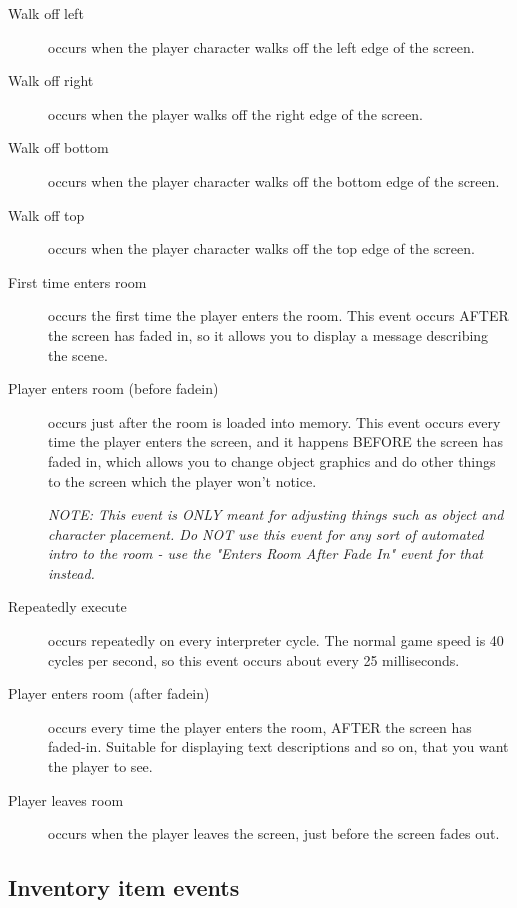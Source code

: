 \begin{description}
\item [Walk off left] occurs when the player character walks off the left edge
of the screen.
\item [Walk off right] occurs when the player walks off the right edge of the
screen.
\item [Walk off bottom] occurs when the player character walks off the bottom
edge of the screen.
\item [Walk off top] occurs when the player character walks off the top edge
of the screen.
\item [First time enters room] occurs the first time the player enters the
room. This event occurs AFTER the screen has faded in, so it allows you to
display a message describing the scene.
\item [Player enters room (before fadein)] occurs just after the room is loaded into memory.
This event occurs every time the player enters the screen, and it happens
BEFORE the screen has faded in, which allows you to change object graphics
and do other things to the screen which the player won't notice.

\it{NOTE: This event is ONLY meant for adjusting things such as object and
character placement. Do NOT use this event for any sort of automated intro
to the room - use the "Enters Room After Fade In" event for that instead.}
\item [Repeatedly execute] occurs repeatedly on every interpreter cycle. The
normal game speed is 40 cycles per second, so this event occurs about
every 25 milliseconds.
\item [Player enters room (after fadein)] occurs every time the player enters the
room, AFTER the screen has faded-in. Suitable for displaying text
descriptions and so on, that you want the player to see.
\item [Player leaves room] occurs when the player leaves the screen, just
before the screen fades out.
\end{description}

\subsection{Inventory item events}%

